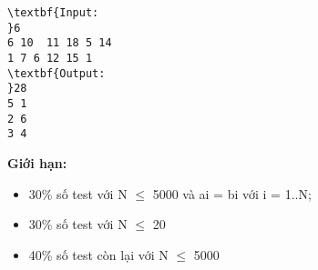 \begin{verbatim}
\textbf{Input:
}6
6 10  11 18 5 14
1 7 6 12 15 1
\textbf{Output:
}28
5 1
2 6
3 4
\end{verbatim}

\textbf{Giới hạn:}
\begin{itemize}
	\item 30\% số test với N  $\le$  5000 và ai = bi với i = 1..N;
	\item 30\% số test với N  $\le$  20
	\item 40\% số test còn lại với N  $\le$  5000 
\end{itemize}
